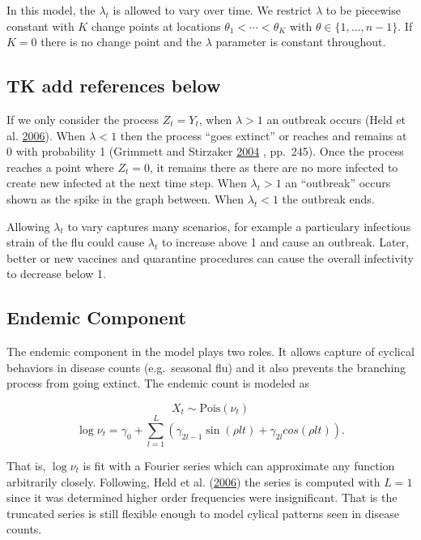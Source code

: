 \documentclass[11pt,a4paper]{article}
\numberwithin{equation}{section}
\begin{document}
In this model, the \(\lambda_t\) is allowed to vary over time. We
restrict \(\lambda\) to be piecewise constant with \(K\) change points
at locations \(\theta_1 < \cdots < \theta_K\) with
\(\theta \in \{1,...,n-1\}\). If \(K = 0\) there is no change point and
the \(\lambda\) parameter is constant throughout.

\hypertarget{tk-add-references-below}{%
\subsection{TK add references below}\label{tk-add-references-below}}

If we only consider the process \(Z_t = Y_t\), when \(\lambda > 1\) an
outbreak occurs (Held et al.
\protect\hyperlink{ref-held_two-component_2006}{2006}). When
\(\lambda < 1\) then the process ``goes extinct'' or reaches and remains
at 0 with probability 1 (Grimmett and Stirzaker
\protect\hyperlink{ref-grimmett_probability_2004}{2004} , pp.~245). Once
the process reaches a point where \(Z_t = 0\), it remains there as there
are no more infected to create new infected at the next time step. When
\(\lambda_t > 1\) an ``outbreak'' occurs shown as the spike in the graph
between. When \(\lambda_t < 1\) the outbreak ends.

Allowing \(\lambda_t\) to vary captures many scenarios, for example a
particulary infectious strain of the flu could cause \(\lambda_t\) to
increase above 1 and cause an outbreak. Later, better or new vaccines
and quarantine procedures can cause the overall infectivity to decrease
below 1.

\hypertarget{endemic-component}{%
\subsection{Endemic Component}\label{endemic-component}}

The endemic component in the model plays two roles. It allows capture of
cyclical behaviors in disease counts (e.g.~seasonal flu) and it also
prevents the branching process from going extinct. The endemic count is
modeled as

\[X_t \sim \text{Pois}(\nu_t)\]
\[\log{\nu_t} = \gamma_0 + \sum_{l = 1}^L (\gamma_{2l-1}\sin(\rho l t)+\gamma_{2l}cos(\rho l t)).\]

That is, \(\log{\nu_t}\) is fit with a Fourier series which can
approximate any function arbitrarily closely. Following, Held et al.
(\protect\hyperlink{ref-held_two-component_2006}{2006}) the series is
computed with \(L = 1\) since it was determined higher order frequencies
were insignificant. That is the truncated series is still flexible
enough to model cylical patterns seen in disease counts.
\end{document}
